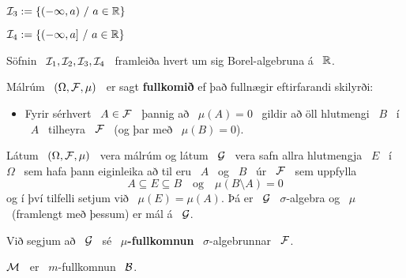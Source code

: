 \documentclass[12pt]{report}
\newcommand{\Om}{\Omega}
\newcommand{\B}{{\cal B}}
\newcommand{\I}{{\cal I}}
\newcommand{\F}{{\cal F}}
\newcommand{\G}{{\cal G}}
\newcommand{\M}{{\cal M}}
\begin{document}
\medskip
$\I_3 := \{(-\infty,a)\ /\ a\in\R\}$

\medskip
$\I_4 := \{(-\infty,a]\ /\ a\in\R\}$

\medskip
\begin{setn*}
Söfnin \ $\I_1,\I_2,\I_3,\I_4$ \ framleiða hvert um sig Borel-algebruna á \ $\mathbb{R}$.
\end{setn*}


\begin{setn*}
Málrúm \ $(\Om,\F,\mu)$ \ er sagt {\bf fullkomið} ef það fullnægir eftirfarandi skilyrði:
\begin{itemize}
\item
Fyrir sérhvert \ $A\in\F$ \ þannig að \ $\mu(A) = 0$ \ gildir að öll hlutmengi \ $B$ \ í \ $A$ \ tilheyra \ $\F$ \ (og þar með \ $\mu(B) = 0$).
\end{itemize} 
\end{setn*}



\begin{setn*}
Látum \ $(\Om,\F,\mu)$ \ vera málrúm og látum \ $\G$ \ vera safn allra hlutmengja \ $E$ \ í \ $\Om$ \ sem hafa þann eiginleika að til eru \ $A$ \ og \ $B$ \ úr \ $\F$ \ sem uppfylla
\[
A\subseteq E\subseteq B\quad\text{og}\quad \mu(B\setminus A) = 0
\]
og í því tilfelli setjum við \ $\mu(E) = \mu(A)$. Þá er \ $\G$ \ $\sigma$-algebra og \ $\mu$ \ (framlengt með þessum) er mál á \ $\G$. 
\end{setn*}

Við segjum að \ $\G$ \ sé \ {\bf $\mu$-fullkomnun} \ $\sigma$-algebrunnar \ $\F$.


\begin{setn*}
$\M$ \ er \ $m$-fullkomnun \ $\B$.
\end{setn*}
\end{document}

